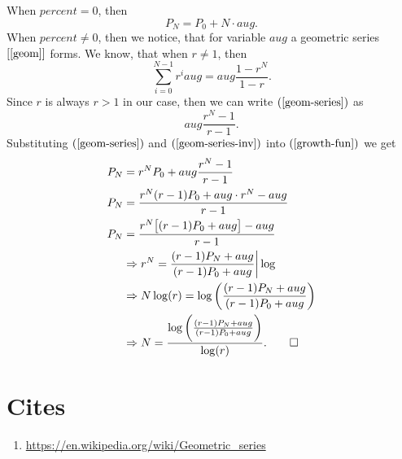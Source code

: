 \documentclass[12pt]{article}
\begin{document}
\hspace{-0.5}When $percent = 0$, then
\begin{equation*}
    P_N = P_0+N\cdot aug.
\end{equation*}
When $percent \ne 0$, then we notice, that for variable $aug$ a geometric series $[\ref{geom}]$ forms.
We know, that when $r\ne 1$, then
\begin{equation}
    \sum_{i=0}^{N-1}r^{i}aug = aug\frac{1-r^{N}}{1-r}. \label{geom-series}
\end{equation}
Since $r$ is always $r>1$ in our case, then we can write $(\ref{geom-series})$ as
\begin{equation}
    aug\frac{r^{N}-1}{r-1}. \label{geom-series-inv}
\end{equation}
Substituting $(\ref{geom-series})$ and $(\ref{geom-series-inv})$ into $(\ref{growth-fun})$ we get
\begin{align*}
    P_{N} &= r^{N}P_{0} + aug\frac{r^{N}-1}{r-1}\\
    P_{N} &= \frac{r^{N}(r-1)P_{0} + aug\cdot r^{N}-aug}{r-1}\\
    P_{N} &= \frac{r^{N}\big[(r-1)P_{0} + aug\big]-aug}{r-1}\\
    &\Rightarrow r^{N} = \frac{(r-1)P_{N}+aug}{(r-1)P_{0} + aug} \bigg | \log\\
    &\Rightarrow N\log(r) = \log\bigg(\frac{(r-1)P_{N}+aug}{(r-1)P_{0} + aug}\bigg)\\
    &\Rightarrow N = \frac{\log\bigg(\frac{(r-1)P_{N}+aug}{(r-1)P_{0} + aug}\bigg)}{\log(r)}.
    \qed
\end{align*}

\section*{Cites}
\begin{enumerate}
    \item \url{https://en.wikipedia.org/wiki/Geometric_series} \label{geom}
\end{enumerate}
\end{document}
